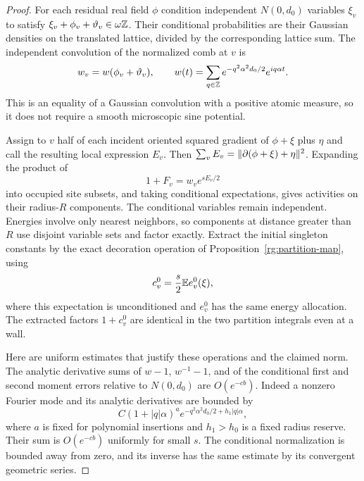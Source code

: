\begin{proof}
For each residual real field $\phi$ condition independent
$N(0,d_0)$ variables $\xi_v$ to satisfy
$\xi_v+\phi_v+\vartheta_v\in\omega\mathbb Z$.  Their conditional probabilities
are their Gaussian densities on the translated lattice, divided by the
corresponding lattice sum.  The independent convolution of the normalized
comb at $v$ is
\begin{equation}
 w_v=w(\phi_v+\vartheta_v),\qquad
 w(t)=\sum_{q\in\mathbb Z}e^{-q^2\alpha^2d_0/2}e^{iq\alpha t}.
 \label{vi:one-site}
\end{equation}
This is an equality of a Gaussian convolution with a positive atomic
measure, so it does not require a smooth microscopic sine potential.

Assign to $v$ half of each incident oriented squared gradient of
$\phi+\xi$ plus $\eta$ and call the resulting local expression $E_v$.
Then $\sum_vE_v=\lVert \partial(\phi+\xi)+\eta\rVert^2$.  Expanding the
product of
\begin{equation}
 1+F_v=w_v e^{sE_v/2}                                      \label{vi:initial-factor}
\end{equation}
into occupied site subsets, and taking conditional expectations, gives
activities on their radius-$R$ components.  The conditional variables
remain independent.  Energies involve only nearest neighbors, so
components at distance greater than $R$ use disjoint variable sets and
factor exactly.  Extract the initial singleton constants by the exact
decoration operation of Proposition~\ref{rg:partition-map}, using
\begin{equation}
 c_v^0=\frac s2\mathbb E e_v^0(\xi),                             \label{vi:initial-constant}
\end{equation}
where this expectation is unconditioned and $e_v^0$ has the same energy
allocation.  The extracted factors $1+c_v^0$ are identical in the two
partition integrals even at a wall.

Here are uniform estimates that justify these operations and the claimed
norm.  The analytic derivative sums of $w-1$, $w^{-1}-1$, and of the
conditional first and second moment errors relative to $N(0,d_0)$ are
$O(e^{-cb})$.  Indeed a nonzero Fourier mode and its analytic derivatives
are bounded by
\[
 C(1+|q|\alpha)^a
      e^{-q^2\alpha^2d_0/2+h_1|q|\alpha},
\]
where $a$ is fixed for polynomial insertions and $h_1>h_0$ is a fixed
radius reserve.  Their sum is $O(e^{-cb})$ uniformly for small $s$.
The conditional normalization is bounded away from zero, and its inverse
has the same estimate by its convergent geometric series.


\end{proof}
